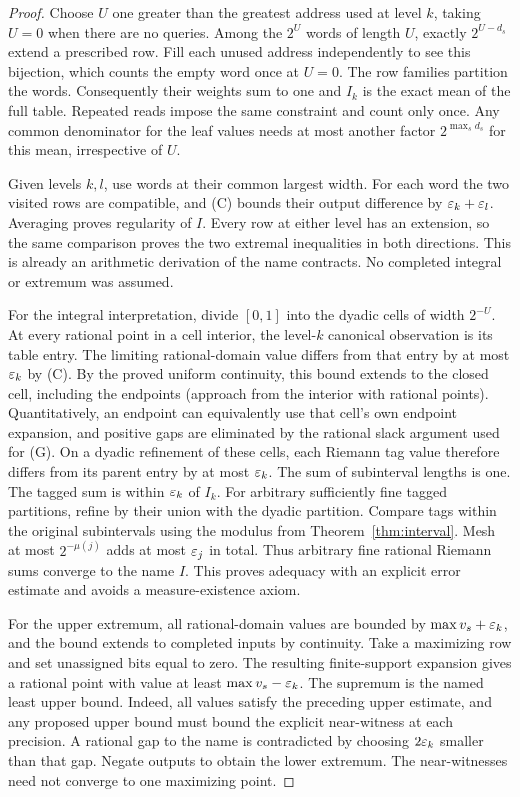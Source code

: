 \begin{proof}
Choose $U$ one greater than the greatest address used at level $k$, taking $U=0$ when there are no queries. Among the $2^U$ words of length $U$, exactly $2^{U-d_s}$ extend a prescribed row. Fill each unused address independently to see this bijection, which counts the empty word once at $U=0$. The row families partition the words. Consequently their weights sum to one and $I_k$ is the exact mean of the full table. Repeated reads impose the same constraint and count only once. Any common denominator for the leaf values needs at most another factor $2^{\max_s d_s}$ for this mean, irrespective of $U$.

Given levels $k,l$, use words at their common largest width. For each word the two visited rows are compatible, and (C) bounds their output difference by $\varepsilon_k+\varepsilon_l$. Averaging proves regularity of $I$. Every row at either level has an extension, so the same comparison proves the two extremal inequalities in both directions. This is already an arithmetic derivation of the name contracts. No completed integral or extremum was assumed.

For the integral interpretation, divide $[0,1]$ into the dyadic cells of width $2^{-U}$. At every rational point in a cell interior, the level-$k$ canonical observation is its table entry. The limiting rational-domain value differs from that entry by at most $\varepsilon_k$ by (C). By the proved uniform continuity, this bound extends to the closed cell, including the endpoints (approach from the interior with rational points). Quantitatively, an endpoint can equivalently use that cell's own endpoint expansion, and positive gaps are eliminated by the rational slack argument used for (G). On a dyadic refinement of these cells, each Riemann tag value therefore differs from its parent entry by at most $\varepsilon_k$. The sum of subinterval lengths is one. The tagged sum is within $\varepsilon_k$ of $I_k$. For arbitrary sufficiently fine tagged partitions, refine by their union with the dyadic partition. Compare tags within the original subintervals using the modulus from Theorem~\ref{thm:interval}. Mesh at most $2^{-\mu(j)}$ adds at most $\varepsilon_j$ in total. Thus arbitrary fine rational Riemann sums converge to the name $I$. This proves adequacy with an explicit error estimate and avoids a measure-existence axiom.

For the upper extremum, all rational-domain values are bounded by $\max v_s+\varepsilon_k$, and the bound extends to completed inputs by continuity. Take a maximizing row and set unassigned bits equal to zero. The resulting finite-support expansion gives a rational point with value at least $\max v_s-\varepsilon_k$. The supremum is the named least upper bound. Indeed, all values satisfy the preceding upper estimate, and any proposed upper bound must bound the explicit near-witness at each precision. A rational gap to the name is contradicted by choosing $2\varepsilon_k$ smaller than that gap. Negate outputs to obtain the lower extremum. The near-witnesses need not converge to one maximizing point.
\end{proof}

